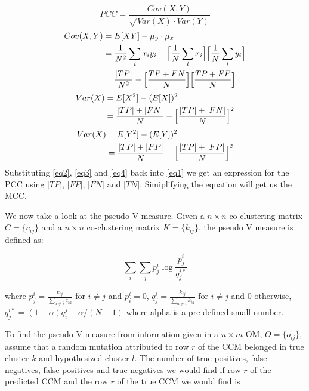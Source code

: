 \documentclass[a4paper, 11pt]{article}
\begin{document}
\begin{equation} \label{eq1}
PCC = \frac{Cov(X, Y)}{\sqrt{Var(X) \cdot Var(Y)}} 
\end{equation}
\vspace{5mm}
\begin{equation} \label{eq2}
\begin{split}
Cov(X, Y) &= E[XY] - \mu_{y} \cdot \mu_{x} \\
    &= \frac{1}{N^2}\sum_{i} x_{i}y_{i} - \Bigl[\frac{1}{N}\sum_{i}x_{i}\Bigr]\Bigl[\frac{1}{N}\sum_{i}y_{i}\Bigr]\\
    &= \frac{|TP|}{N^2} - \Bigl[\frac{TP+FN}{N}\Bigr]\Bigl[\frac{TP+FP}{N}\Bigr]
\end{split}
\end{equation}
\vspace{5mm}
\begin{equation} \label{eq3}
\begin{split}
Var(X) &= E[X^2] - (E[X])^2 \\
    &= \frac{|TP|+|FN|}{N} - \Bigl[\frac{|TP|+|FN|}{N}\Bigr]^2
\end{split}
\end{equation}
\vspace{5mm}
\begin{equation} \label{eq4}
\begin{split}
Var(X) &= E[Y^2] - (E[Y])^2 \\
    &= \frac{|TP|+|FP|}{N} - \Bigl[\frac{|TP|+|FP|}{N}\Bigr]^2
\end{split}
\end{equation}
\vspace{10mm}
Substituting \ref{eq2}, \ref{eq3} and \ref{eq4} back into \ref{eq1} we get an expression for the PCC using $|TP|$, $|FP|$, $|FN|$ and $|TN|$. Simiplifying the equation will get us the MCC. 

We now take a look at the pseudo V measure. Given a $n \times n$ co-clustering matrix $C = \{c_{ij}\}$ and a $n \times n$ co-clustering matrix $K= \{k_{ij}\}$, the pseudo V measure is defined as:

$$ \sum_{i} \sum_{j} p_j^i\log \frac{p_j^i}{q_j^{i*}} $$

where $p_j^i = \frac{c_{ij}}{\sum_{a \neq i} c_{ia}}$ for $i \neq j$ and $p_i^i = 0$, $q_j^i = \frac{k_{ij}}{\sum_{a \neq i} k_{ia}}$ for $i \neq j$ and $0$ otherwise, $q_j^{i*} = (1-\alpha)q_i^j+\alpha/(N-1)$ where alpha is a pre-defined small number.

To find the pseudo V measure from information given in a $n \times m$ OM, $O=\{o_{ij}\}$, assume that a random mutation attributed to row $r$ of the CCM belonged in true cluster $k$ and hypothesized cluster $l$. The number of true positives, false negatives, false positives and true negatives we would find if row $r$ of the predicted CCM and the row $r$ of the true CCM we would find is 
\end{document}
